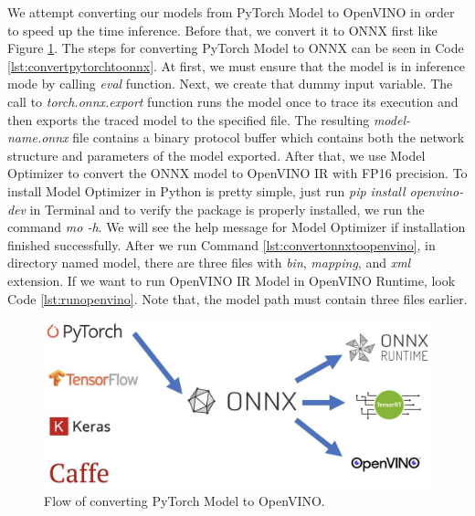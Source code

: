 

We attempt converting our models from PyTorch Model to OpenVINO in order to speed up the time inference. Before that, we convert it to ONNX first like Figure \ref{fig:pytorch-to-openvino}.
The steps for converting PyTorch Model to ONNX can be seen in Code \ref{lst:convertpytorchtoonnx}. At first, we must ensure that the model is in inference mode by calling \emph{eval} function.
Next, we create that dummy input variable. The call to \emph{torch.onnx.export} function runs the model once to trace its execution and then exports the traced model to the specified file.
The resulting \emph{model-name.onnx} file contains a binary protocol buffer which contains both the network structure and parameters of the model exported.
After that, we use Model Optimizer to convert the ONNX model to OpenVINO IR with FP16 precision. To install Model Optimizer in Python is pretty simple, just run
\emph{pip install openvino-dev} in Terminal and to verify the package is properly installed, we run the command \emph{mo -h}. We will see the help message for Model Optimizer if installation finished successfully.
After we run Command \ref{lst:convertonnxtoopenvino}, in directory named model, there are three files with \emph{bin}, \emph{mapping}, and \emph{xml} extension.
If we want to run OpenVINO IR Model in OpenVINO Runtime, look Code \ref{lst:runopenvino}. Note that, the model path must contain three files earlier.

\begin{figure}[ht]
  \centering
  \includegraphics[scale=0.45]{gambar/pytorch-onnx-openvino.jpg}
  \caption{Flow of converting PyTorch Model to OpenVINO.}
  \label{fig:pytorch-to-openvino}
\end{figure}



